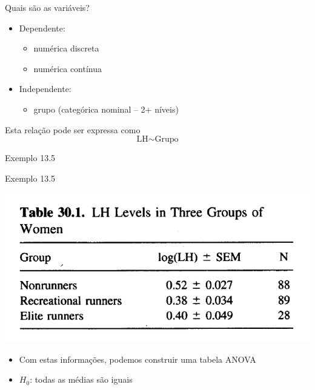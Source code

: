 \documentclass{beamer}
\begin{document}
\begin{frame}{Quais são as variáveis?}
  \begin{itemize}
    \small
  \item Dependente:
    \begin{itemize}
      \footnotesize
    \item numérica discreta
    \item numérica contínua
    \end{itemize}
  \item Independente:
    \begin{itemize}
      \footnotesize
    \item grupo (categórica nominal -- 2+ níveis)
    \end{itemize}
  \end{itemize}
  \vfill
  \begin{block}{Esta relação pode ser expressa como}
    \begin{displaymath}
      \text{LH} \sim \text{Grupo}
    \end{displaymath}
  \end{block}
\end{frame}

\begin{frame}[label=exemplo13.5-tabela]{\small Exemplo 13.5}
  \begin{exampleblock}{Exemplo 13.5}
    \begin{center}
      \includegraphics[width=.6\textwidth]{Cap13-30/exemplo13_5-1}
    \end{center}
    \begin{itemize}
      \footnotesize
    \item Com estas informações, podemos construir uma tabela ANOVA
      \small
    \item $H_0$: todas as médias são iguais
    \end{itemize}
  \end{exampleblock}
\end{frame}
\end{document}
